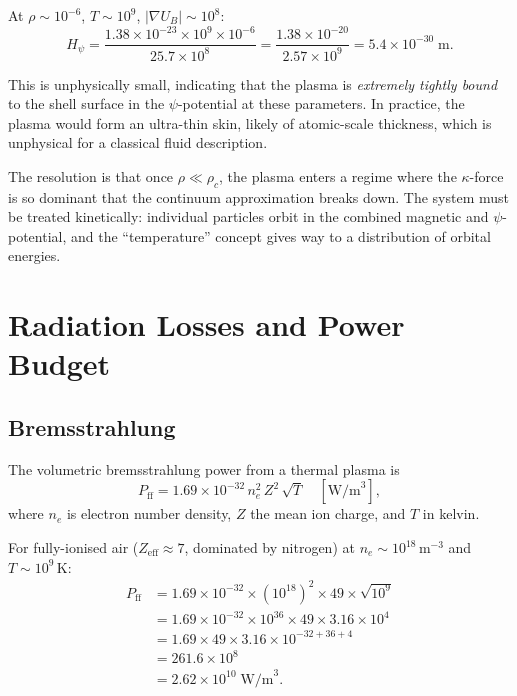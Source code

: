 \documentclass[12pt,a4paper]{article}
\begin{document}
At $\rho \sim 10^{-6}$, $T \sim 10^9$, $|\nabla U_B| \sim 10^8$:
\begin{equation}
  H_{\psi} = \frac{1.38\times10^{-23} \times 10^9 \times 10^{-6}}{25.7 \times 10^8}
    = \frac{1.38\times10^{-20}}{2.57\times10^{9}}
    = 5.4 \times 10^{-30} \; \text{m}.
\end{equation}

This is unphysically small, indicating that the plasma is \emph{extremely tightly bound}
to the shell surface in the $\psi$-potential at these parameters.  In practice, the plasma
would form an ultra-thin skin, likely of atomic-scale thickness, which is unphysical for
a classical fluid description.

The resolution is that once $\rho \ll \rho_c$, the plasma enters a regime where the
$\kappa$-force is so dominant that the continuum approximation breaks down.  The system
must be treated kinetically: individual particles orbit in the combined magnetic and
$\psi$-potential, and the ``temperature'' concept gives way to a distribution of orbital
energies.

\section{Radiation Losses and Power Budget}
\label{sec:power}

\subsection{Bremsstrahlung}

The volumetric bremsstrahlung power from a thermal plasma is
\begin{equation}
  P_{\text{ff}} = 1.69 \times 10^{-32} \, n_e^2 \, Z^2 \, \sqrt{T} \quad [\text{W/m}^3],
\end{equation}
where $n_e$ is electron number density, $Z$ the mean ion charge, and $T$ in kelvin.

For fully-ionised air ($Z_{\text{eff}} \approx 7$, dominated by nitrogen) at
$n_e \sim 10^{18}$\,m$^{-3}$ and $T \sim 10^9$\,K:
\begin{align}
  P_{\text{ff}} &= 1.69\times10^{-32} \times (10^{18})^2 \times 49 \times \sqrt{10^9} \\
    &= 1.69\times10^{-32} \times 10^{36} \times 49 \times 3.16\times10^4 \\
    &= 1.69 \times 49 \times 3.16 \times 10^{-32+36+4} \\
    &= 261.6 \times 10^{8} \\
    &= 2.62 \times 10^{10} \; \text{W/m}^3.
\end{align}
\end{document}
